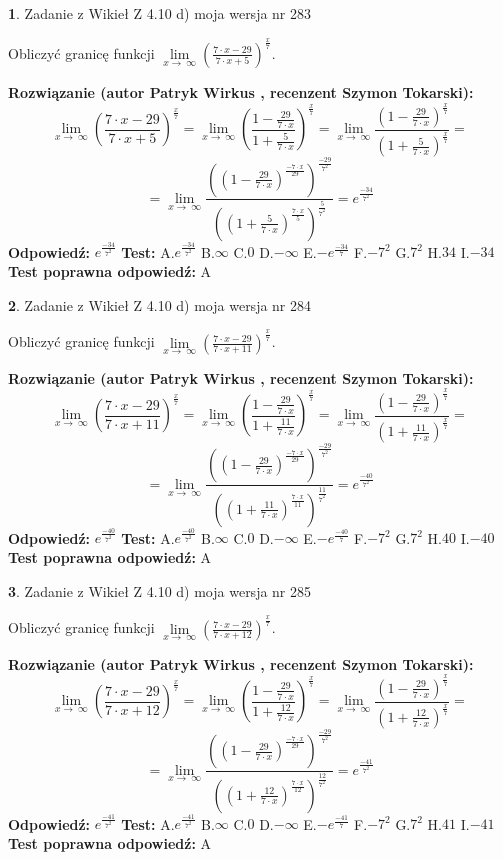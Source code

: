 \documentclass[12pt, a4paper]{article}
\theoremstyle{definition} %
\newtheorem{zad}{}
\newcommand{\zadStart}[1]{\begin{zad}#1\newline}
\newcommand{\zadStop}{\end{zad}}
\newcommand{\rozwStart}[2]{\noindent \textbf{Rozwiązanie (autor #1 , recenzent #2): }\newline}
\newcommand{\rozwStop}{\newline}
\newcommand{\odpStart}{\noindent \textbf{Odpowiedź:}\newline}
\newcommand{\odpStop}{\newline}
\newcommand{\testStart}{\noindent \textbf{Test:}\newline}
\newcommand{\testStop}{\newline}
\newcommand{\kluczStart}{\noindent \textbf{Test poprawna odpowiedź:}\newline}
\newcommand{\kluczStop}{\newline}
\begin{document}
\zadStart{Zadanie z Wikieł Z 4.10 d) moja wersja nr 283}


Obliczyć granicę funkcji  $\lim\limits_{x\to\ \infty}(\frac{7\cdot x-29}{7\cdot x+5})^{\frac{x}{7}}$.
\zadStop
\rozwStart{Patryk Wirkus}{Szymon Tokarski}
$$\lim\limits_{x\to\ \infty}(\frac{7\cdot x-29}{7\cdot x+5})^{\frac{x}{7}} = \lim\limits_{x\to\ \infty}(\frac{1-\frac{29}{7\cdot x}}{1+\frac{5}{7\cdot x}})^{\frac{x}{7}}=\lim\limits_{x\to\ \infty}\frac{(1-\frac{29}{7\cdot x})^{\frac{x}{7}}}{(1+\frac{5}{7\cdot x})^{\frac{x}{7}}}=$$
$$=\lim\limits_{x\to\ \infty}\frac{((1-\frac{29}{7\cdot x})^{\frac{-7\cdot x}{29}})^{\frac{-29}{7^{2}}}}{((1+\frac{5}{7\cdot x})^{\frac{7\cdot x}{5}})^{\frac{5}{7^{2}}}}=e^{\frac{-34}{7^{2}}}$$
\rozwStop
\odpStart
$e^{\frac{-34}{7^{2}}}$
\odpStop
\testStart
A.$e^{\frac{-34}{7^{2}}}$ B.$\infty$ C.$0$ D.$-\infty$ E.$-e^{\frac{-34}{7}}$
F.$-7^{2}$ G.$7^{2}$
H.$34$
I.$-34$
\testStop
\kluczStart
A
\kluczStop



\zadStart{Zadanie z Wikieł Z 4.10 d) moja wersja nr 284}


Obliczyć granicę funkcji  $\lim\limits_{x\to\ \infty}(\frac{7\cdot x-29}{7\cdot x+11})^{\frac{x}{7}}$.
\zadStop
\rozwStart{Patryk Wirkus}{Szymon Tokarski}
$$\lim\limits_{x\to\ \infty}(\frac{7\cdot x-29}{7\cdot x+11})^{\frac{x}{7}} = \lim\limits_{x\to\ \infty}(\frac{1-\frac{29}{7\cdot x}}{1+\frac{11}{7\cdot x}})^{\frac{x}{7}}=\lim\limits_{x\to\ \infty}\frac{(1-\frac{29}{7\cdot x})^{\frac{x}{7}}}{(1+\frac{11}{7\cdot x})^{\frac{x}{7}}}=$$
$$=\lim\limits_{x\to\ \infty}\frac{((1-\frac{29}{7\cdot x})^{\frac{-7\cdot x}{29}})^{\frac{-29}{7^{2}}}}{((1+\frac{11}{7\cdot x})^{\frac{7\cdot x}{11}})^{\frac{11}{7^{2}}}}=e^{\frac{-40}{7^{2}}}$$
\rozwStop
\odpStart
$e^{\frac{-40}{7^{2}}}$
\odpStop
\testStart
A.$e^{\frac{-40}{7^{2}}}$ B.$\infty$ C.$0$ D.$-\infty$ E.$-e^{\frac{-40}{7}}$
F.$-7^{2}$ G.$7^{2}$
H.$40$
I.$-40$
\testStop
\kluczStart
A
\kluczStop



\zadStart{Zadanie z Wikieł Z 4.10 d) moja wersja nr 285}


Obliczyć granicę funkcji  $\lim\limits_{x\to\ \infty}(\frac{7\cdot x-29}{7\cdot x+12})^{\frac{x}{7}}$.
\zadStop
\rozwStart{Patryk Wirkus}{Szymon Tokarski}
$$\lim\limits_{x\to\ \infty}(\frac{7\cdot x-29}{7\cdot x+12})^{\frac{x}{7}} = \lim\limits_{x\to\ \infty}(\frac{1-\frac{29}{7\cdot x}}{1+\frac{12}{7\cdot x}})^{\frac{x}{7}}=\lim\limits_{x\to\ \infty}\frac{(1-\frac{29}{7\cdot x})^{\frac{x}{7}}}{(1+\frac{12}{7\cdot x})^{\frac{x}{7}}}=$$
$$=\lim\limits_{x\to\ \infty}\frac{((1-\frac{29}{7\cdot x})^{\frac{-7\cdot x}{29}})^{\frac{-29}{7^{2}}}}{((1+\frac{12}{7\cdot x})^{\frac{7\cdot x}{12}})^{\frac{12}{7^{2}}}}=e^{\frac{-41}{7^{2}}}$$
\rozwStop
\odpStart
$e^{\frac{-41}{7^{2}}}$
\odpStop
\testStart
A.$e^{\frac{-41}{7^{2}}}$ B.$\infty$ C.$0$ D.$-\infty$ E.$-e^{\frac{-41}{7}}$
F.$-7^{2}$ G.$7^{2}$
H.$41$
I.$-41$
\testStop
\kluczStart
A
\kluczStop
\end{document}
